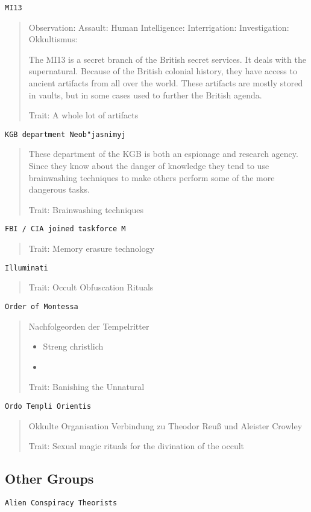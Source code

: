 \documentclass[11pt]{article}
\begin{document}
{\texttt{MI13}
\begin{quote}
Observation: 
Assault: 
Human Intelligence: 
Interrigation: 
Investigation:
Okkultismus: 

The MI13 is a secret branch of the British secret services. It deals with the supernatural. Because of the British colonial history, they have access to ancient artifacts from all over the world. These artifacts are mostly stored in vaults, but in some cases used to further the British agenda.

Trait: A whole lot of artifacts
\end{quote}


\texttt{KGB department Neob"jasnimyj}
\begin{quote}
These department of the KGB is both an espionage and research agency. Since they know about the danger of knowledge they tend to use brainwashing techniques to make others perform some of the more dangerous tasks.

Trait: Brainwashing techniques 
\end{quote}

\texttt{FBI / CIA joined taskforce M} 
\begin{quote}
Trait: Memory erasure technology
\end{quote}

\texttt{Illuminati}
\begin{quote}
Trait: Occult Obfuscation Rituals
\end{quote}

\texttt{Order of Montessa}
\begin{quote}
Nachfolgeorden der Tempelritter
\begin{itemize}
\item Streng christlich
\item 
\end{itemize}

Trait: Banishing the Unnatural
\end{quote}

\texttt{Ordo Templi Orientis}
\begin{quote}
Okkulte Organisation
Verbindung zu Theodor Reuß und Aleister Crowley

Trait: Sexual magic rituals for the divination of the occult
\end{quote}

\subsection{Other Groups}
\label{sec:org02ea893}
\texttt{Alien Conspiracy Theorists}

}
\end{document}
